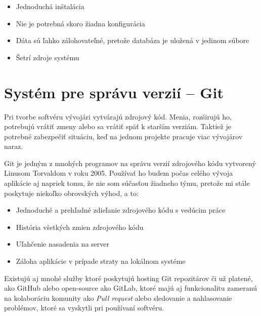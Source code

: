 \begin{itemize}
    \item Jednoduchá inštalácia
    \item Nie je potrebná skoro žiadna konfigurácia
    \item Dáta sú ľahko zálohovateľné, pretože databáza je uložená v jedinom súbore
    \item Šetrí zdroje systému
\end{itemize}

\section{Systém pre správu verzií -- Git}

Pri tvorbe softvéru vývojári vytvárajú zdrojový kód. Menia, rozširujú ho, potrebujú vrátiť zmeny alebo sa vrátiť späť k starším verziám. Taktiež je potrebné zabezpečiť situáciu, keď na jednom projekte pracuje viac vývojárov naraz. \citep{otte2009version} 

Git je jedným z mnohých programov na správu verzií zdrojového kódu vytvorený Linusom Torvaldom v roku 2005. Používať ho budem počas celého vývoja aplikácie aj napriek tomu, že nie som súčasťou žiadneho týmu, pretože mi stále poskytuje niekoľko obrovských výhod, a to: 

\begin{itemize}
    \item Jednoduché a prehľadné zdieľanie zdrojového kódu s vedúcim práce
    \item História všetkých zmien zdrojového kódu
    \item Uľahčenie nasadenia na server
    \item Záloha aplikácie v prípade straty na lokálnom systéme
\end{itemize}

Existujú aj mnohé služby ktoré poskytujú hosting Git repozitárov či už platené, ako GitHub alebo open-source ako GitLab, ktoré majú aj funkcionalitu zameranú na kolaboráciu komunity ako \emph{Pull request} alebo sledovanie a nahlasovanie problémov, ktoré sa vyskytli pri používaní softvéru.